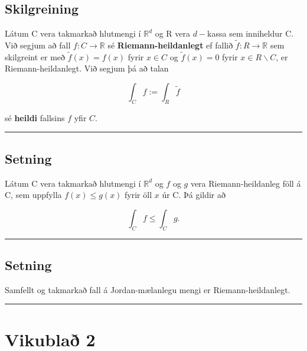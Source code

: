 \documentclass[]{book}
\begin{document}
\hypertarget{skilgreining-4}{%
\section{Skilgreining}\label{skilgreining-4}}

Látum C vera takmarkað hlutmengi í \(\mathbb R^d\) og R vera \(d-\)kassa sem inniheldur C. Við segjum að fall \(f: C\rightarrow\mathbb R\) sé \textbf{Riemann-heildanlegt} ef fallið \(\tilde f:R\rightarrow\mathbb R\) sem skilgreint er með \(\tilde f(x) = f(x)\) fyrir \(x \in C\) og \(\tilde f(x) = 0\) fyrir \(x \in R \backslash C\), er Riemann-heildanlegt. Við segjum þá að talan

\[
\int_C f := \int_R \tilde f
\]

sé \textbf{heildi} fallsins \(f\) yfir \(C\).

\begin{center}\rule{0.5\linewidth}{\linethickness}\end{center}

\hypertarget{setning-16}{%
\section{Setning}\label{setning-16}}

Látum C vera takmarkað hlutmengi í \(\mathbb R^d\) og \(f\) og \(g\) vera Riemann-heildanleg föll á C, sem uppfylla \(f(x) \leq g(x)\) fyrir öll \(x\) úr C. Þá gildir að

\[
\int_C f \leq \int_C g.
\]

\begin{center}\rule{0.5\linewidth}{\linethickness}\end{center}

\hypertarget{setning-17}{%
\section{Setning}\label{setning-17}}

Samfellt og takmarkað fall á Jordan-mælanlegu mengi er Riemann-heildanlegt.

\begin{center}\rule{0.5\linewidth}{\linethickness}\end{center}

\hypertarget{vikubla-2}{%
\chapter*{Vikublað 2}\label{vikubla-2}}
\end{document}
